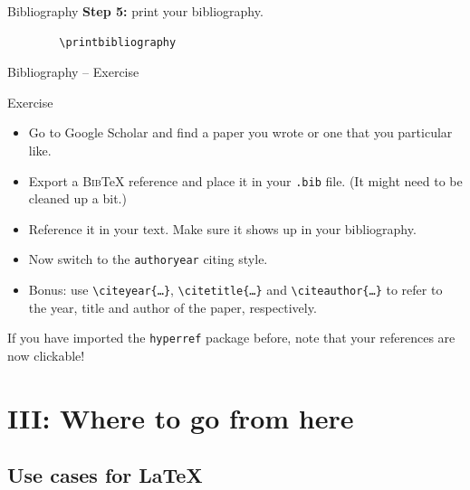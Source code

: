 \documentclass{beamer}
\newcommand{\code}[1]{\texttt{#1}}
\newcommand{\filename}[1]{\texttt{#1}}
\newcommand{\command}[2]{\texttt{\textbackslash#1\{#2\}}}
\newcommand{\bibtex}{{\rmfamily\scshape{}Bib}\TeX{}}
\begin{document}
\begin{frame}[fragile]{Bibliography}
    \textbf{Step 5:} print your bibliography.
    \medskip

    {\centering
        \begin{verbatim}
        \printbibliography
    \end{verbatim}}
    \printbibliography[heading=none]
\end{frame}

\begin{frame}{Bibliography -- Exercise}
    \begin{block}{Exercise}
        \begin{itemize}
            \item Go to Google Scholar and find a paper you wrote or one that you particular like.
            \item Export a \bibtex{} reference and place it in your \filename{.bib} file. (It might need to be cleaned up a bit.)
            \item Reference it in your text. Make sure it shows up in your bibliography.
            \item Now switch to the \code{authoryear} citing style.
            \item Bonus: use \command{citeyear}{\ldots}, \command{citetitle}{\ldots} and \command{citeauthor}{\ldots} to refer to the year, title and author of the paper, respectively.
        \end{itemize}
    \end{block}

    \bigskip

    If you have imported the \code{hyperref} package before, note that your references are now clickable!
\end{frame}

\section{III: Where to go from here}

\subsection{Use cases for \LaTeX}
\end{document}
